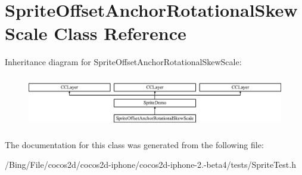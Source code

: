 \hypertarget{interface_sprite_offset_anchor_rotational_skew_scale}{\section{Sprite\-Offset\-Anchor\-Rotational\-Skew\-Scale Class Reference}
\label{interface_sprite_offset_anchor_rotational_skew_scale}
}
Inheritance diagram for Sprite\-Offset\-Anchor\-Rotational\-Skew\-Scale\-:\begin{figure}[H]
\begin{center}
\leavevmode
\includegraphics[height=2.276423cm]{interface_sprite_offset_anchor_rotational_skew_scale}
\end{center}
\end{figure}


The documentation for this class was generated from the following file\-:\begin{DoxyCompactItemize}
\item 
/\-Bing/\-File/cocos2d/cocos2d-\/iphone/cocos2d-\/iphone-\/2.-\/beta4/tests/Sprite\-Test.\-h\end{DoxyCompactItemize}
